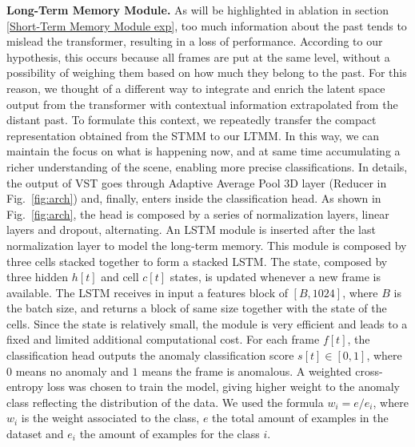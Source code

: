 \noindent\textbf{Long-Term Memory Module.}
\label{Long-Term Memory Module descr}
As will be highlighted in ablation in section \ref{Short-Term Memory Module exp}, too much information about the past tends to mislead the transformer, resulting in a loss of performance.
According to our hypothesis, this occurs because all frames are put at the same level, without a possibility of weighing them based on how much they belong to the past.
For this reason, we thought of a different way to integrate and enrich the latent space output from the transformer with contextual information extrapolated from the distant past.
To formulate this context, we repeatedly transfer the compact representation obtained from the STMM to our LTMM.
In this way, we can maintain the focus on what is happening now, and at same time accumulating a richer understanding of the scene, enabling more precise classifications.
In details, the output of VST goes through Adaptive Average Pool 3D layer (Reducer in Fig.~\ref{fig:arch}) and, finally, enters inside the classification head.
As shown in Fig.~\ref{fig:arch}, the head is composed by a series of normalization layers, linear layers and dropout, alternating. 
An LSTM module is inserted after the last normalization layer to model the long-term memory.
This module is composed by three cells stacked together to form a stacked LSTM.
The state, composed by three hidden $h[t]$ and cell $c[t]$ states, is updated whenever a new frame is available.
The LSTM receives in input a features block of $[B, 1024]$, where $B$ is the batch size, and returns a block of same size together with the state of the cells.
Since the state is relatively small, the module is very efficient and leads to a fixed and limited additional computational cost.
For each frame $f[t]$, the classification head outputs the anomaly classification score $s[t] \in [0,1]$, where $0$ means no anomaly and $1$ means the frame is anomalous.
A weighted cross-entropy loss was chosen to train the model, giving higher weight to the anomaly class reflecting the distribution of the data.
We used the formula $w_i = e / e_i$, where $w_i$ is the weight associated to the class, $e$ the total amount of examples in the dataset and $e_i$ the amount of examples for the class $i$.

